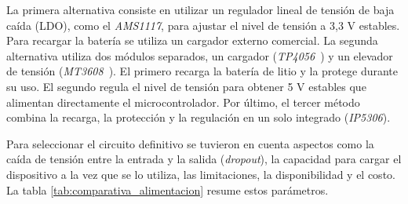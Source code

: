 La primera alternativa consiste en utilizar un regulador lineal de tensión de baja caída (LDO), como el \emph{AMS1117}, para ajustar el nivel de tensión a 3,3 V estables. Para recargar la batería se utiliza un cargador externo comercial. La segunda alternativa utiliza dos módulos separados, un cargador (\emph{TP4056}~\cite{tp4056}) y un elevador de tensión (\emph{MT3608}~\cite{mt3608}). El primero recarga la batería de litio y la protege durante su uso. El segundo regula el nivel de tensión para obtener 5 V estables que alimentan directamente el microcontrolador. Por último, el tercer método combina la recarga, la protección y la regulación en un solo integrado (\emph{IP5306}).

Para seleccionar el circuito definitivo se tuvieron en cuenta aspectos como la caída de tensión entre la entrada y la salida (\emph{dropout}), la capacidad para cargar el dispositivo a la vez que se lo utiliza, las limitaciones, la disponibilidad y el costo. La tabla \ref{tab:comparativa_alimentacion} resume estos parámetros.

